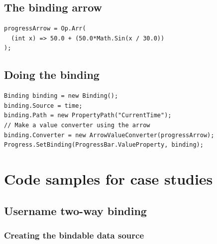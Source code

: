 \documentclass[12pt,twoside,notitlepage]{report}
\begin{document}
\section{The binding arrow}

\begin{lstlisting}
progressArrow = Op.Arr(
  (int x) => 50.0 + (50.0*Math.Sin(x / 30.0))
);
\end{lstlisting}

\section{Doing the binding}

\begin{lstlisting}
Binding binding = new Binding();
binding.Source = time;
binding.Path = new PropertyPath("CurrentTime");
// Make a value converter using the arrow
binding.Converter = new ArrowValueConverter(progressArrow);
Progress.SetBinding(ProgressBar.ValueProperty, binding);
\end{lstlisting}

\cleardoublepage


\chapter{Code samples for case studies} \label{sec:case_studies}

\section{Username two-way binding} \label{sec:case_study_name}

\subsection{Creating the bindable data source}

\begin{parcolumns}{2}
\end{parcolumns}
\end{document}
